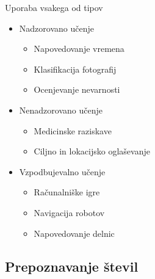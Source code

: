 \documentclass{beamer}
\begin{document}
\begin{frame}{Uporaba vsakega od tipov}
  \begin{itemize}
  \item
   Nadzorovano učenje
	\begin{itemize}
  	\item
   	  Napovedovanje vremena
  	\item
   	  \alert{Klasifikacija fotografij}
  	\item
   	  Ocenjevanje nevarnosti
	\end{itemize}
  \item
  Nenadzorovano učenje
    	\begin{itemize}
  	\item
   	  Medicinske raziskave
  	\item
   	  \alert{Ciljno in lokacijsko oglaševanje}
	\end{itemize}
  \item
   Vzpodbujevalno učenje
 	\begin{itemize}
  	\item
   	  Računalniške igre
  	\item
   	  \alert{Navigacija robotov}
  	\item
   	  Napovedovanje delnic
	\end{itemize}
  \end{itemize}
\end{frame}


\subsection{Prepoznavanje števil}
\end{document}
